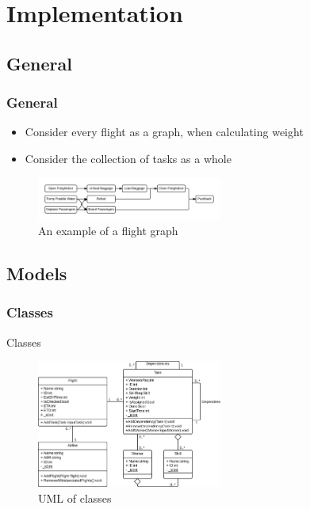 \section{Implementation}
\lstset{
    style=customc,
  numbers=left,    
  firstnumber=1,
  numberfirstline=true
}

\subsection{General}
\begin{frame}
\frametitle{General}
  \begin{itemize}
		\item Consider every flight as a graph, when calculating weight
		\item Consider the collection of tasks as a whole
	\end{itemize}
	\begin{figure}[H]
        \centering
        \includegraphics[width=230px]{Grafik/TestCase2Illu}
        \caption{\footnotesize An example of a flight graph}
    \end{figure}
\end{frame}

\subsection{Models}
\subsubsection{Classes}
\begin{frame}{Classes}{}
    \begin{figure}[H]
        \centering
        \includegraphics[width=230px]{Grafik/UML}
        \caption{\footnotesize UML of classes}
    \end{figure}
\end{frame}

